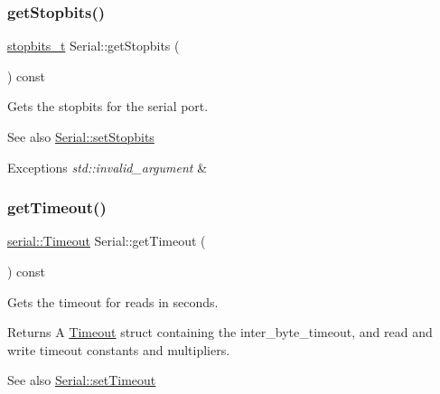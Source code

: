 \subsubsection{\texorpdfstring{get\+Stopbits()}{getStopbits()}}
{\footnotesize\ttfamily \mbox{\hyperlink{namespaceserial_af5b116611d6628a3aa8f788fdc09f469}{stopbits\+\_\+t}} Serial\+::get\+Stopbits (\begin{DoxyParamCaption}{ }\end{DoxyParamCaption}) const}

Gets the stopbits for the serial port.

\begin{DoxySeeAlso}{See also}
\mbox{\hyperlink{classserial_1_1_serial_ab72284b5aab723b81013fb560bd6acc5}{Serial\+::set\+Stopbits}}
\end{DoxySeeAlso}

\begin{DoxyExceptions}{Exceptions}
{\em std\+::invalid\+\_\+argument} & \\
\hline
\end{DoxyExceptions}
\mbox{\label{classserial_1_1_serial_a2502ea6b503c96f64b767365965c4198}} 
\subsubsection{\texorpdfstring{get\+Timeout()}{getTimeout()}}
{\footnotesize\ttfamily \mbox{\hyperlink{structserial_1_1_timeout}{serial\+::\+Timeout}} Serial\+::get\+Timeout (\begin{DoxyParamCaption}{ }\end{DoxyParamCaption}) const}

Gets the timeout for reads in seconds.

\begin{DoxyReturn}{Returns}
A \mbox{\hyperlink{structserial_1_1_timeout}{Timeout}} struct containing the inter\+\_\+byte\+\_\+timeout, and read and write timeout constants and multipliers.
\end{DoxyReturn}
\begin{DoxySeeAlso}{See also}
\mbox{\hyperlink{classserial_1_1_serial_a4fc63af4b800a9f9e757414f38f3e8b3}{Serial\+::set\+Timeout}} 
\end{DoxySeeAlso}
\mbox{\label{classserial_1_1_serial_a5b4069da8ec84ee4331d0690b325d08d}} 

